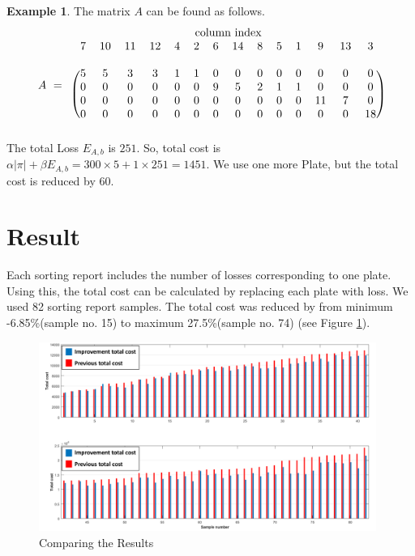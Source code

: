 \documentclass[a4paper]{amsart}
\numberwithin{equation}{section} %
\numberwithin{figure}{section} %
\numberwithin{table}{section}
\theoremstyle{plain}
\theoremstyle{definition}
\newtheorem{example}[thm]{Example}
\theoremstyle{plain}
\theoremstyle{plain}
\theoremstyle{plain}
\theoremstyle{plain}
\theoremstyle{plain}
\begin{document}
\begin{example}
\noindent	
The matrix $A$ can be found as follows.
\begin{equation*}
\begin{array}{rc}
&\text{column index}\\
A\,\,=&
\begin{blockarray}{cccccccccccccc}
7 & 10 & 11 & 12 & 4 & 2 & 6 & 14 & 8 & 5 & 1 & 9 & 13 & 3\\
&&&&&&&&&&&&&\\
\begin{block}{(cccccccccccccc)}
5 & 5 & 3 & 3 & 1 & 1 & 0 & 0 & 0 & 0 & 0 & 0 & 0 & 0 \\
0 & 0 & 0 & 0 & 0 & 0 & 9 & 5 & 2 & 1 & 1 & 0 & 0 & 0 \\
0 & 0 & 0 & 0 & 0 & 0 & 0 & 0 & 0 & 0 & 0 & 11& 7 & 0 \\
0 & 0 & 0 & 0 & 0 & 0 & 0 & 0 & 0 & 0 & 0 & 0 & 0 & 18\\
\end{block}
\end{blockarray}
\end{array}
\end{equation*}
\noindent
The total Loss $E_{A,b}$ is $251$. So, total cost is $\alpha|\pi|+\beta E_{A,b}=300 \times 5+1 \times 251 =1451$. We use one more Plate, but the total cost is reduced by $60$.
	

	
\end{example}



\section{Result}\label{sec:Result}

Each sorting report includes the number of losses corresponding to one plate. 
Using this, the total cost can be calculated by replacing each plate with loss. 
We used 82 sorting report samples.
The total cost was reduced by from minimum -6.85\%(sample no. 15) to maximum 27.5\%(sample no. 74) (see Figure \ref{fig:Comparing}).

\begin{figure}[h!]
	\centering
	\includegraphics[width=11cm]{Graph_2.pdf}
	\caption{Comparing the Results}
	\label{fig:Comparing}       %
\end{figure}
\end{document}
